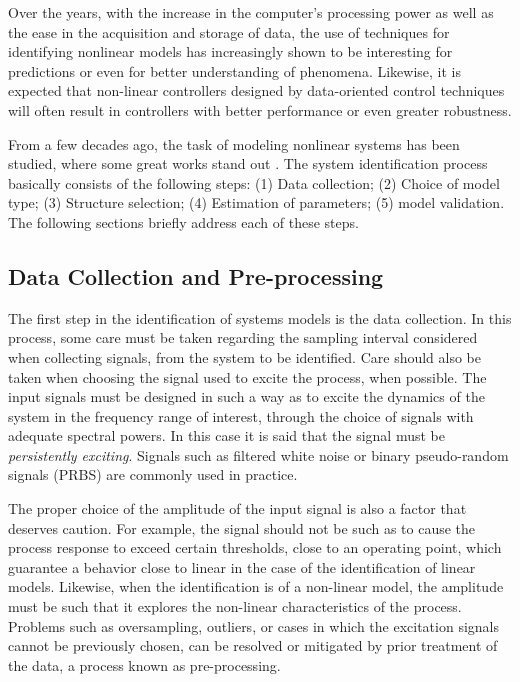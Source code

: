 Over the years, with the increase in the computer's processing power as well as the ease in the acquisition and storage of data, the use of techniques for identifying nonlinear models has increasingly shown to be interesting for predictions or even for better understanding of phenomena. Likewise, it is expected that non-linear controllers designed by data-oriented control techniques will often result in controllers with better performance or even greater robustness.

From a few decades ago, the task of modeling nonlinear systems has been studied, where some great works stand out \citep{billings1980,leontaritis1985,leontaritis1985a,korenberg1988,billings1989,chen1990,chen1992,aguirre1995,aguirre2000,zhu2005}.
The system identification process basically consists of the following steps: (1) Data collection; (2) Choice of model type; (3) Structure selection; (4) Estimation of parameters; (5) model validation. The following sections briefly address each of these steps.

\subsection{Data Collection and Pre-processing} \label{sec:collection}
The first step in the identification of systems models is the data collection. In this process, some care must be taken regarding the sampling interval considered when collecting signals, from the system to be identified.  Care should also be taken when choosing the signal used to excite the process, when possible.
The input signals must be designed in such a way as to excite the dynamics of the system in the frequency range of interest, through the choice of signals with adequate spectral powers. In this case it is said that the signal must be \textit{persistently exciting}. Signals such as filtered white noise or binary pseudo-random signals (PRBS) are commonly used in practice.

The proper choice of the amplitude of the input signal is also a factor that deserves caution. For example, the signal should not be such as to cause the process response to exceed certain thresholds, close to an operating point, which guarantee a behavior close to linear in the case of the identification of linear models. Likewise, when the identification is of a non-linear model, the amplitude must be such that it explores the non-linear characteristics of the process.
Problems such as oversampling, outliers, or cases in which the excitation signals cannot be previously chosen, can be resolved or mitigated by prior treatment of the data, a process known as pre-processing.


